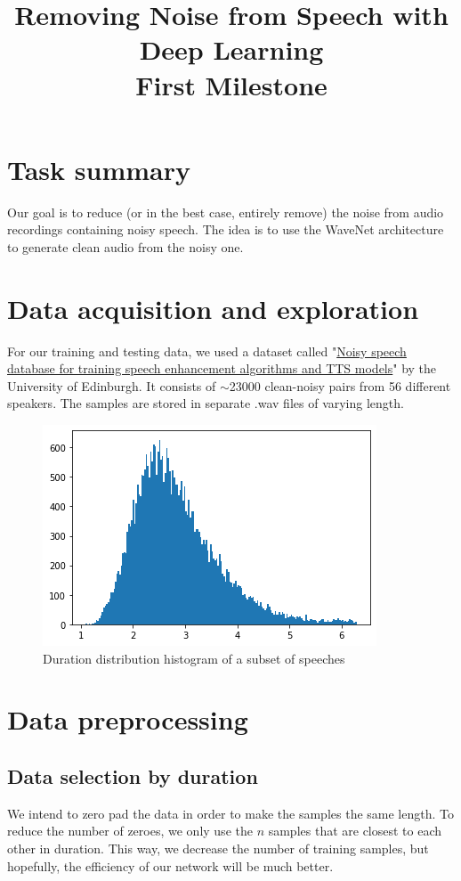 \documentclass[12pt]{article}
\title{Removing Noise from Speech with Deep Learning\\
	\Large{First Milestone}}
\author{}
\date{}
\begin{document}
	
	\maketitle
	\section{Task summary}
	Our goal is to reduce (or in the best case, entirely remove) the noise from audio recordings containing noisy speech. The idea is to use the WaveNet\cite{wavenet} architecture to generate clean audio from the noisy one.
	
	
	\section{Data acquisition and exploration}
	For our training and testing data, we used a dataset called "\href{https://datashare.is.ed.ac.uk/handle/10283/2791}{Noisy speech database for training speech enhancement algorithms and TTS models}"\cite{dataset} by the University of Edinburgh. It consists of $\sim$23000 clean-noisy pairs from 56 different speakers. 
	The samples are stored in separate .wav files of varying length.  
	
	\begin{figure}[H]
		\centering
		\includegraphics[width=.5\linewidth]{durations}
		\caption{Duration distribution histogram of a subset of speeches}
	\end{figure}
	
	
	
	\section{Data preprocessing}
	\subsection{Data selection by duration} \label{sel_dur}
	We intend to zero pad the data in order to make the samples the same length. To reduce the number of zeroes, we only use the $n$ samples that are closest to each other in duration. This way, we decrease the number of training samples, but hopefully, the efficiency of our network will be much better.
	
\end{document}
